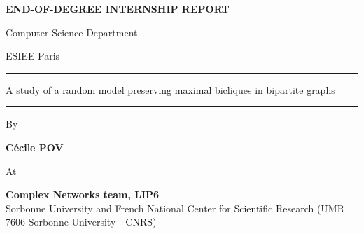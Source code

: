 \documentclass[table]{report}
\begin{document}
{\large

\vspace*{1cm}

\begin{center}

{\bf END-OF-DEGREE INTERNSHIP REPORT}

\vspace*{0.4cm}

Computer Science Department 

\vspace*{0.1cm}

ESIEE Paris

\vspace*{1cm}

\rule{\linewidth}{0.5pt}
{\Large {\sc A study of a random model preserving maximal bicliques in bipartite graphs}}
\rule{\linewidth}{1pt}

\vspace*{0.5cm}
By\ \\


\vspace*{0.5cm}


{\Large {\bf Cécile POV}}

\vspace*{1cm}


At

\vspace*{0.5cm}

{\Large {\bf Complex Networks team, LIP6} \\
Sorbonne University and French National Center for Scientific Research (UMR 7606 Sorbonne University - CNRS)}




\vspace*{1cm}

\end{center}

%  

\vspace*{1.5cm} 
\\[2ex]
\\[1ex]


}
\end{document}
